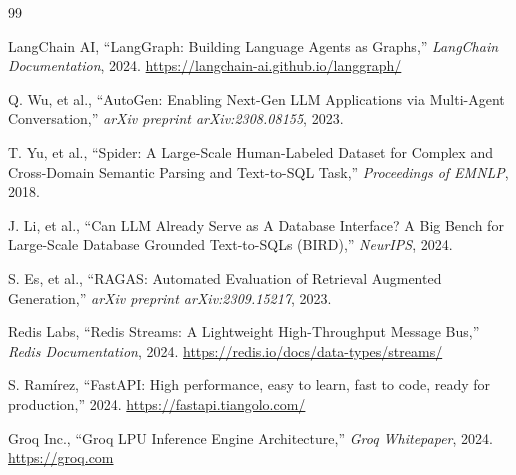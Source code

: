 \documentclass[12pt, a4paper]{article}
\begin{document}
\begin{thebibliography}{99}

LangChain AI, ``LangGraph: Building Language Agents as Graphs,'' \textit{LangChain Documentation}, 2024. \url{https://langchain-ai.github.io/langgraph/}

Q. Wu, et al., ``AutoGen: Enabling Next-Gen LLM Applications via Multi-Agent Conversation,'' \textit{arXiv preprint arXiv:2308.08155}, 2023.

T. Yu, et al., ``Spider: A Large-Scale Human-Labeled Dataset for Complex and Cross-Domain Semantic Parsing and Text-to-SQL Task,'' \textit{Proceedings of EMNLP}, 2018.

J. Li, et al., ``Can LLM Already Serve as A Database Interface? A Big Bench for Large-Scale Database Grounded Text-to-SQLs (BIRD),'' \textit{NeurIPS}, 2024.

S. Es, et al., ``RAGAS: Automated Evaluation of Retrieval Augmented Generation,'' \textit{arXiv preprint arXiv:2309.15217}, 2023.

Redis Labs, ``Redis Streams: A Lightweight High-Throughput Message Bus,'' \textit{Redis Documentation}, 2024. \url{https://redis.io/docs/data-types/streams/}

S. Ramírez, ``FastAPI: High performance, easy to learn, fast to code, ready for production,'' 2024. \url{https://fastapi.tiangolo.com/}

Groq Inc., ``Groq LPU Inference Engine Architecture,'' \textit{Groq Whitepaper}, 2024. \url{https://groq.com}

\end{thebibliography}
\end{document}
